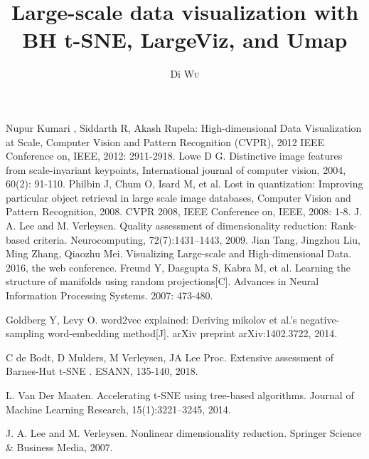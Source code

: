 \documentclass{EPL-master-thesis-covers-EN}
\title{Large-scale data visualization with BH t-SNE, LargeViz, and Umap}
\author{Di \textsc{Wu}}
\begin{document}
  \maketitle
  
\thispagestyle{empty}		%



\listoftodos

\tableofcontents
\newpage


% 



% 

\begin{thebibliography}{99}  
Nupur Kumari , Siddarth R, Akash Rupela: High-dimensional Data Visualization at Scale, Computer Vision and Pattern Recognition (CVPR), 2012 IEEE Conference on, IEEE, 2012: 2911-2918.  
Lowe D G. Distinctive image features from scale-invariant keypoints, International journal of computer vision, 2004, 60(2): 91-110.  
Philbin J, Chum O, Isard M, et al. Lost in quantization: Improving particular object retrieval in large scale image databases, Computer Vision and Pattern Recognition, 2008. CVPR 2008, IEEE Conference on, IEEE, 2008: 1-8.
J. A. Lee and M. Verleysen. Quality assessment of dimensionality reduction: Rank-based criteria. Neurocomputing, 72(7):1431–1443, 2009.
Jian Tang, Jingzhou Liu, Ming Zhang, Qiaozhu Mei. Visualizing Large-scale and High-dimensional Data. 2016, the web conference.
Freund Y, Dasgupta S, Kabra M, et al. Learning the structure of manifolds using random projections[C]. Advances in Neural Information Processing Systems. 2007: 473-480.

Goldberg Y, Levy O. word2vec explained: Deriving mikolov et al.’s negative-sampling word-embedding method[J]. arXiv preprint arXiv:1402.3722, 2014.

C de Bodt, D Mulders, M Verleysen, JA Lee Proc. Extensive assessment of Barnes-Hut t-SNE . ESANN, 135-140, 2018.

L. Van Der Maaten. Accelerating t-SNE using tree-based algorithms. Journal of Machine Learning Research, 15(1):3221–3245, 2014.

J. A. Lee and M. Verleysen. Nonlinear dimensionality reduction. Springer Science & Business Media, 2007.


\end{thebibliography}
\end{document}
